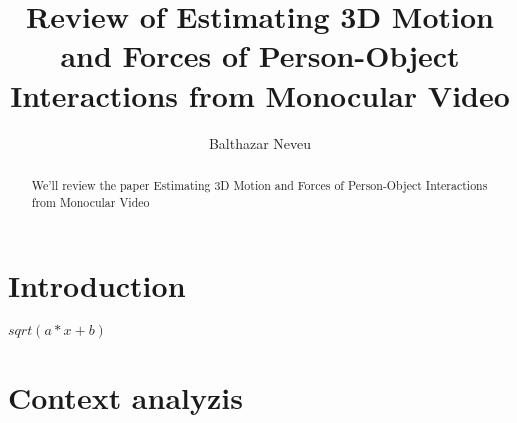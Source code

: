 \documentclass[sigconf]{acmart}
\begin{document}
\title{Review of Estimating 3D Motion and Forces of Person-Object Interactions from Monocular Video}

\author{Balthazar Neveu}


\renewcommand{\shortauthors}{MVA et al.}

\begin{abstract}
  We'll review the paper Estimating 3D Motion and Forces of Person-Object Interactions
  from Monocular Video \cite{li2019}
\end{abstract}





\maketitle

\section{Introduction}

\cite{li2019}
$sqrt(a*x+b)$

\section{Context analyzis}



\end{document}
